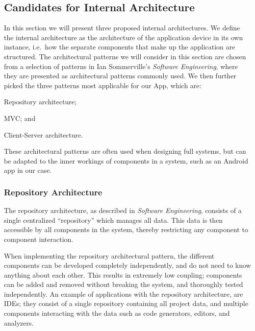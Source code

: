 \subsection{Candidates for Internal Architecture}
In this section we will present three proposed internal architectures.
We define the internal architecture as the architecture of the application device in its own instance, i.e.\ how the separate components that make up the application are structured.
The architectural patterns we will consider in this section are chosen from a selection of patterns in Ian Sommerville's \textit{Software Engineering}\cite[p. 175-184]{sommerville}, where they are presented as architectural patterns commonly used.
We then further picked the three patterns most applicable for our App, which are:
\begin{eletterate*}
    \item Repository architecture;
    \item \ac{MVC}; and
    \item Client-Server architecture.
\end{eletterate*}
These architectural patterns are often used when designing full systems, but can be adapted to the inner workings of components in a system, such as an Android app in our case.

\subsubsection{Repository Architecture}
The repository architecture, as described in \textit{Software Engineering}\cite[p. 179-180]{sommerville}, consists of a single centralized \enquote{repository} which manages all data.
This data is then accessible by all components in the system, thereby restricting any component to component interaction.

When implementing the repository architectural pattern, the different components can be developed completely independently, and do not need to know anything about each other.
This results in extremely low coupling; components can be added and removed without breaking the system, and thoroughly tested independently.
An example of applications with the repository architecture, are IDEs; they consist of a single repository containing all project data, and multiple components interacting with the data such as code generators, editors, and analyzers.

